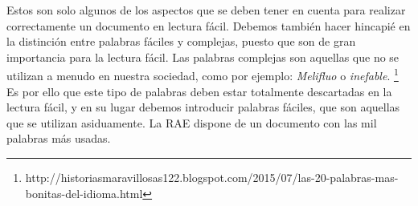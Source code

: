 Estos son solo algunos de los aspectos que se deben tener en cuenta para realizar correctamente un documento en lectura fácil. \newline
Debemos también hacer hincapié en la distinción entre palabras fáciles y complejas, puesto que son de gran importancia para la lectura fácil. 
Las palabras complejas son aquellas que no se utilizan a menudo en nuestra sociedad, como por ejemplo: \textit{Melifluo} o \textit{inefable}.
\footnote{http://historiasmaravillosas122.blogspot.com/2015/07/las-20-palabras-mas-bonitas-del-idioma.html}
Es por ello que este tipo de palabras deben estar totalmente descartadas en la lectura fácil, y en su lugar debemos introducir palabras fáciles, que son aquellas que se utilizan asiduamente. La RAE dispone de un documento con las mil palabras más usadas.

